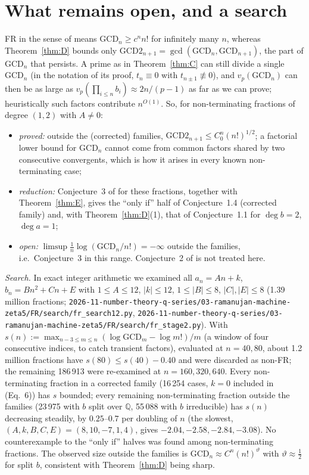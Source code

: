 \documentclass[11pt]{amsart}
\theoremstyle{definition}
\theoremstyle{remark}
\numberwithin{equation}{section}
\newcommand{\Q}{\mathbb{Q}}
\newcommand{\GCD}{\mathrm{GCD}}
\newcommand{\file}[1]{\nolinkurl{2026-11-number-theory-q-series/03-ramanujan-machine-zeta5/#1}}
\begin{document}
\section{What remains open, and a search}\label{sec:open}

FR in the sense of \cite{BDNM} means $\GCD_n\ge c^nn!$ for infinitely many $n$, whereas Theorem~\ref{thm:D} bounds only $\GCD2_{n+1}=\gcd(\GCD_n,\GCD_{n+1})$, the part of $\GCD_n$ that persists. A prime as in Theorem~\ref{thm:C} can still divide a single $\GCD_n$ (in the notation of its proof, $t_n\equiv0$ with $t_{n\pm1}\not\equiv0$), and $v_p(\GCD_n)$ can then be as large as $v_p(\prod_{i\le n}b_i)\approx2n/(p-1)$ as far as we can prove; heuristically such factors contribute $n^{O(1)}$. So, for non-terminating fractions of degree $(1,2)$ with $A\neq0$:
\begin{itemize}[leftmargin=1.3em]
\item \emph{proved:} outside the (corrected) families, $\GCD2_{n+1}\le C_0^n(n!)^{1/2}$; a factorial lower bound for $\GCD_n$ cannot come from common factors shared by two consecutive convergents, which is how it arises in every known non-terminating case;
\item \emph{reduction:} Conjecture~3 of \cite{BDNM} for these fractions, together with Theorem~\ref{thm:E}, gives the ``only if'' half of Conjecture~1.4 (corrected family) and, with Theorem~\ref{thm:D}(1), that of Conjecture~1.1 for $\deg b=2$, $\deg a=1$;
\item \emph{open:} $\limsup\frac1n\log(\GCD_n/n!)=-\infty$ outside the families, i.e.\ Conjecture~3 in this range. Conjecture~2 of \cite{BDNM} is not treated here.
\end{itemize}

\emph{Search.} In exact integer arithmetic we examined all $a_n=An+k$, $b_n=Bn^2+Cn+E$ with $1\le A\le12$, $|k|\le12$, $1\le|B|\le8$, $|C|,|E|\le8$ (1.39 million fractions; \file{FR/search/fr_search12.py}, \file{FR/search/fr_stage2.py}). With $s(n):=\max_{n-3\le m\le n}(\log\GCD_m-\log m!)/m$ (a window of four consecutive indices, to catch transient factors), evaluated at $n=40,80$, about 1.2 million fractions have $s(80)\le s(40)-0.40$ and were discarded as non-FR; the remaining 186\,913 were re-examined at $n=160,320,640$. Every non-terminating fraction in a corrected family (16\,254 cases, $k=0$ included in (Eq.~6)) has $s$ bounded; every remaining non-terminating fraction outside the families (23\,975 with $b$ split over $\Q$, 55\,088 with $b$ irreducible) has $s(n)$ decreasing steadily, by $0.25$--$0.7$ per doubling of $n$ (the slowest, $(A,k,B,C,E)=(8,10,-7,1,4)$, gives $-2.04,-2.58,-2.84,-3.08$). No counterexample to the ``only if'' halves was found among non-terminating fractions. The observed size outside the families is $\GCD_n\approx C^n(n!)^\vartheta$ with $\vartheta\approx\frac12$ for split $b$, consistent with Theorem~\ref{thm:D} being sharp.
\end{document}
